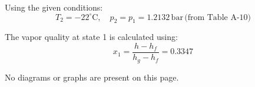 Using the given conditions:  
\[
T_2 = -22^\circ \text{C}, \quad p_2 = p_1 = 1.2132 \, \text{bar} \, \text{(from Table A-10)}
\]  

The vapor quality at state 1 is calculated using:  
\[
x_1 = \frac{h - h_f}{h_g - h_f} = 0.3347
\]  

No diagrams or graphs are present on this page.